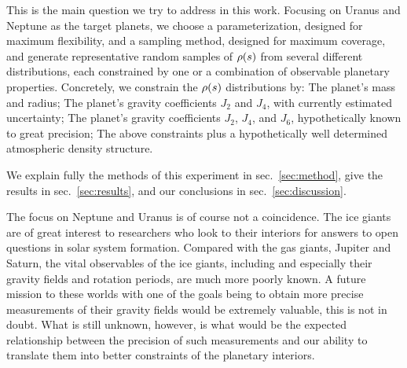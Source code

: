 This is the main question we try to address in this work. Focusing on Uranus and
Neptune as the target planets, we choose a parameterization, designed for
maximum flexibility, and a sampling method, designed for maximum coverage, and
generate representative random samples of $\rho(s)$ from several different
distributions, each constrained by one or a combination of observable planetary
properties. Concretely, we constrain the $\rho(s)$ distributions by: The planet's
mass and radius; The planet's gravity coefficients $J_2$ and $J_4$, with
currently estimated uncertainty; The planet's gravity coefficients $J_2$, $J_4$,
and $J_6$, hypothetically known to great precision; The above constraints plus a
hypothetically well determined atmospheric density structure.

We explain fully the methods of this experiment in sec.~\ref{sec:method}, give
the results in sec.~\ref{sec:results}, and our conclusions in
sec.~\ref{sec:discussion}.

The focus on Neptune and Uranus is of course not a coincidence. The ice giants
are of great interest to researchers who look to their interiors for answers to
open questions in solar system formation. Compared with the gas giants, Jupiter
and Saturn, the vital observables of the ice giants, including and especially
their gravity fields and rotation periods, are much more poorly known. A future
mission to these worlds with one of the goals being to obtain more precise
measurements of their gravity fields would be extremely valuable, this is not in
doubt. What is still unknown, however, is what would be the expected
relationship between the precision of such measurements and our ability to
translate them into better constraints of the planetary interiors.